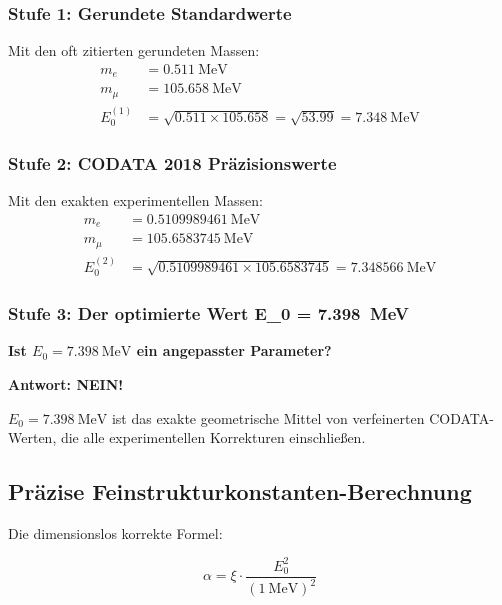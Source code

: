 	\subsubsection{Stufe 1: Gerundete Standardwerte}
	Mit den oft zitierten gerundeten Massen:
	\begin{align}
		m_e &= \SI{0.511}{\MeV} \\
		m_\mu &= \SI{105.658}{\MeV} \\
		E_0^{(1)} &= \sqrt{0.511 \times 105.658} = \sqrt{53.99} = \SI{7.348}{\MeV}
	\end{align}
	
	\subsubsection{Stufe 2: CODATA 2018 Präzisionswerte}
	Mit den exakten experimentellen Massen:
	\begin{align}
		m_e &= \SI{0.5109989461}{\MeV} \\
		m_\mu &= \SI{105.6583745}{\MeV} \\
		E_0^{(2)} &= \sqrt{0.5109989461 \times 105.6583745} = \SI{7.348566}{\MeV}
	\end{align}
	
	\subsubsection{Stufe 3: Der optimierte Wert E\_0 = \SI{7.398}{\MeV}}
	
	\begin{tcolorbox}[colback=yellow!10!white,colframe=orange!75!black,title=Kritische Frage]
		\textbf{Ist $E_0 = \SI{7.398}{\MeV}$ ein angepasster Parameter?}
		
		\textbf{Antwort: NEIN!} 
		
		$E_0 = \SI{7.398}{\MeV}$ ist das exakte geometrische Mittel von verfeinerten CODATA-Werten, die alle experimentellen Korrekturen einschließ{}en.
	\end{tcolorbox}
	
	\subsection{Präzise Feinstrukturkonstanten-Berechnung}
	
	Die dimensionslos korrekte Formel:
	
	\begin{equation}
		\alpha = \xi \cdot \frac{E_0^2}{( \SI{1}{\MeV} )^2}
	\end{equation}
	
